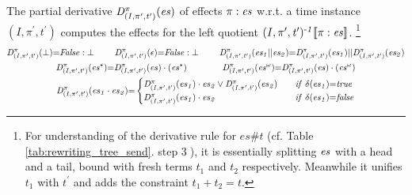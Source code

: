 \documentclass[acmsmall,10pt,review]{acmart}
\newcommand{\es}{\textcolor{black}{\ensuremath{{es}}}}
\newcommand{\timedEffects}{\emph{TimEffs}}
\newcommand{\seq}{\cdot}
\newcommand{\code}[1]{{\tt{\ensuremath{\m{#1}}}}}
\newcommand{\esn}[2]{\ensuremath{#1^{#2}}}
\newcommand{\empt}{\textcolor{black}{\ensuremath{\epsilon}}}
\newcommand{\bott}{\textcolor{black}{\ensuremath{\bot}}}
\newcommand{\m}{\mathit}
\newcommand\tabref[1]{Table \textcolor{black}{\ref{#1}}.}
\begin{document}
\begin{definition}[Partial Derivative\footnote{Intuitively, the partial derivative refers to the left quotient of a language equation, for example, for REs, \code{x^{{-}1} \llbracket x\cdot y\rrbracket {=} y};  \code{y^{{-}1} \llbracket x\cdot y\rrbracket {=} \bott}; and  \code{y^{{-}1} \llbracket x + y\rrbracket {=} \epsilon}. Here we come up with a new notion of partial derivative for \timedEffects. 
}]\label{Derivative}
The partial derivative \code{D^{\pi}_{(I, \pi^\prime, t^\prime)}(\es)} 
of effects \code{\pi : \es} 
w.r.t. a time instance \code{(I, \pi^\prime, t^\prime)} computes the  effects for the left quotient \code{(I, \pi^\prime, t^\prime)^{\text{-}1}\llbracket \pi : \es \rrbracket}. \footnote{For understanding of the derivative rule for \code{es\# t} (cf. \tabref{tab:rewriting_tree_send}  step \textcircled{3}), it is essentially splitting \code{\es} with a head and a tail, bound with fresh terms \code{t_1} and \code{t_2} respectively. Meanwhile it unifies \code{t_1} with \code{t^\prime} and  adds the constraint \code{t_1 {+} t_2 {=} t}.}
\begin{gather*}
\code{D^{\pi}_{(I, \pi^\prime, t^\prime)}(\bott) {=}}  
 \code{False : \bott} 
\qquad\ 
\code{D^{\pi}_{(I, \pi^\prime, t^\prime)}(  \empt) {=}}   
\code{False : \bott} 
\qquad \ 
\code{D^{\pi}_{(I, \pi^\prime, t^\prime)}(es_1 || es_2)} {=} \code{D^{\pi}_{(I, \pi^\prime, t^\prime)}(es_1)} || \code{D^{\pi}_{(I, \pi^\prime, t^\prime)}( es_2)} 
    \\
        \code{D^{\pi}_{(I, \pi^\prime, t^\prime)}(  \esn{\es}{\star}) } {=} \code{ D^{\pi}_{(I, \pi^\prime, t^\prime)}(  {\es}) \cdot (\esn{\es}{\star})}  
        \qquad\qquad
                \code{D^{\pi}_{(I, \pi^\prime, t^\prime)}(  \esn{\es}{\omega}) } {=} \code{ D^{\pi}_{(I, \pi^\prime, t^\prime)}(  {\es}) \cdot (\esn{\es}{\omega})}  
\\
{
 \code{D^{\pi}_{(I, \pi^\prime, t^\prime)}(   \es_1 \seq \es_2) {=} }
\begin{cases}
      \code{D^{\pi}_{(I, \pi^\prime, t^\prime)}(   \es_1) \cdot  \es_2 \vee  D^{\pi}_{(I, \pi^\prime, t^\prime)}( \es_2)} \quad &\code{if\ \delta(\es_1) {=} true}   \\
      \code{D^{\pi}_{(I, \pi^\prime, t^\prime)}  ( \es_1) \cdot  \es_2} & \code{if\ \delta(\es_1) {=} false} 
    \end{cases} 
}
\end{gather*}
\end{definition}
\end{document}

